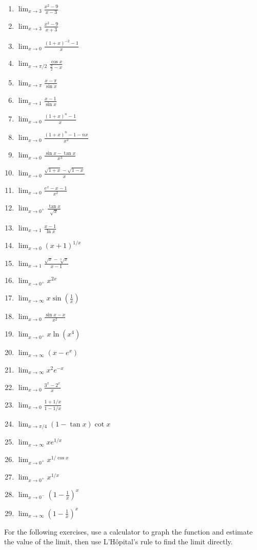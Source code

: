 \documentclass{exercises}
\begin{document}
\begin{enumerate}[resume]
\item $\lim_{x\to3}\frac{x^{2}-9}{x-3}$
\item $\lim_{x\to3}\frac{x^{2}-9}{x+3}$
\item $\lim_{x\to0}\frac{{(1+x)}^{-2}-1}{x}$
\item $\lim_{x\to \pi/2}\frac{\cos x}{\frac{\pi}{2}-x}$
\item $\lim_{x\to \pi}\frac{x-\pi}{\sin x}$
\item $\lim_{x\to1}\frac{x-1}{\sin x}$
\item $\lim_{x\to0}\frac{{(1+x)}^{n}-1}{x}$
\item $\lim_{x\to0}\frac{{(1+x)}^{n}-1-nx}{x^{2}}$
\item $\lim_{x\to0}\frac{\sin x-\tan x}{x^{3}}$
\item $\lim_{x\to0}\frac{\sqrt{1+x}-\sqrt{1-x}}{x}$
\item $\lim_{x\to0}\frac{e^{x}-x-1}{x^{2}}$
\item $\lim_{x\to0^{+}}\frac{\tan x}{\sqrt{x}}$
\item $\lim_{x\to1}\frac{x-1}{\ln x}$
\item $\lim_{x\to0}{(x+1)}^{1/x}$
\item $\lim_{x\to1}\frac{\sqrt{x}-\sqrt[3]{x}}{x-1}$
\item $\lim_{x\to0^{+}}x^{2x}$
\item $\lim_{x\to \infty}x\sin(\frac{1}{x})$
\item $\lim_{x\to0}\frac{\sin x-x}{x^{2}}$
\item $\lim_{x\to0^{+}}x\ln(x^{4})$
\item $\lim_{x\to \infty}(x-e^{x})$
\item $\lim_{x\to \infty}x^{2}e^{-x}$
\item $\lim_{x\to0}\frac{3^{x}-2^{x}}{x}$
\item $\lim_{x\to0}\frac{1+1/x}{1-1/x}$
\item $\lim_{x\to \pi/4}(1-\tan x)\cot x$
\item $\lim_{x\to \infty}xe^{1/x}$
\item $\lim_{x\to0^{+}}x^{1/\cos x}$
\item $\lim_{x\to0^{+}}x^{1/x}$
\item $\lim_{x\to0^{-}}{(1-\frac{1}{x})}^{x}$
\item $\lim_{x\to \infty}{(1-\frac{1}{x})}^{x}$
\end{enumerate}

For the following exercises, use a calculator to graph the function and estimate the value of the limit, then use L'Hôpital's rule to find the limit directly.
\end{document}
